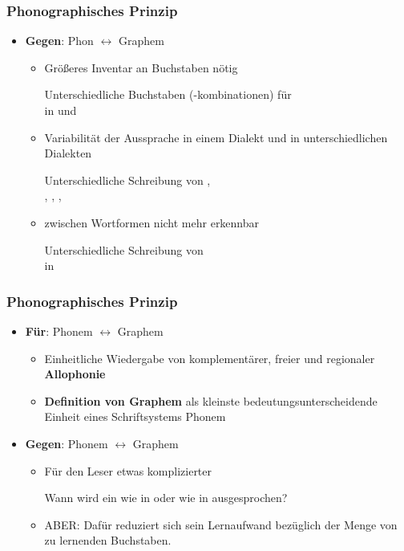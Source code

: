 \begin{frame}
\frametitle{Phonographisches Prinzip}

\begin{itemize}
	\item \textbf{Gegen}: Phon $\leftrightarrow$ Graphem
	
	 \begin{itemize}
	 	\item Größeres Inventar an Buchstaben nötig

                   Unterschiedliche Buchstaben (-kombinationen) für \\
	 	\zB in  und 
	 	
	 	\item Variabilität der Aussprache in einem Dialekt und in unterschiedlichen Dialekten

		Unterschiedliche Schreibung von ,\\
		\zB {}, , , 
		
		\item {} zwischen Wortformen nicht mehr erkennbar
		
		Unterschiedliche Schreibung von \\
		\zB in  \vs {}
		
	 \end{itemize}
\end{itemize}


\end{frame}



\begin{frame}
\frametitle{Phonographisches Prinzip}

\begin{itemize}
	\item \textbf{Für}: Phonem $\leftrightarrow$ Graphem
	
	\begin{itemize}
		\item Einheitliche Wiedergabe von komplementärer, freier und
regionaler \textbf{Allophonie}
		\item \textbf{Definition von Graphem} als kleinste
bedeutungsunterscheidende Einheit eines Schriftsystems \ras
Phonem
	\end{itemize}
	
	\item \textbf{Gegen}: Phonem $\leftrightarrow$ Graphem
	
	\begin{itemize}
		\item Für den Leser etwas komplizierter
		
		Wann wird ein  wie in  oder wie in  ausgesprochen?
		
		\item ABER: Dafür reduziert sich sein Lernaufwand bezüglich der Menge von zu lernenden Buchstaben.	
	\end{itemize}
\end{itemize}


\end{frame}



